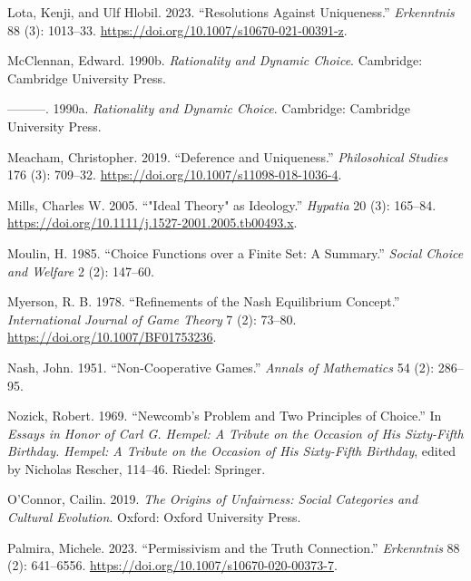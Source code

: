 \documentclass[
  12pt,
  letterpaper,
  DIV=11,
  numbers=noendperiod]{scrreprt}
\newlength{\cslhangindent}
\newlength{\cslentryspacingunit} %
\newenvironment{CSLReferences}[2] %
 {%
  \setlength{\parindent}{0pt}
  \ifodd #1
  \let\oldpar\par
  \def\par{\hangindent=\cslhangindent\oldpar}
  \fi
  \setlength{\parskip}{#2\cslentryspacingunit}
 }%
 {}
\begin{document}
\begin{CSLReferences}{1}{0}
\leavevmode{}%
Lota, Kenji, and Ulf Hlobil. 2023. {``Resolutions Against Uniqueness.''}
\emph{Erkenntnis} 88 (3): 1013--33.
\url{https://doi.org/10.1007/s10670-021-00391-z}.

\leavevmode{}%
McClennan, Edward. 1990b. \emph{Rationality and Dynamic Choice}.
Cambridge: {C}ambridge {U}niversity {P}ress.

\leavevmode{}%
---------. 1990a. \emph{Rationality and Dynamic Choice}. Cambridge:
Cambridge University Press.

\leavevmode{}%
Meacham, Christopher. 2019. {``Deference and Uniqueness.''}
\emph{Philosohical Studies} 176 (3): 709--32.
\url{https://doi.org/10.1007/s11098-018-1036-4}.

\leavevmode{}%
Mills, Charles W. 2005. {``"Ideal Theory" as Ideology.''} \emph{Hypatia}
20 (3): 165--84.
\url{https://doi.org/10.1111/j.1527-2001.2005.tb00493.x}.

\leavevmode{}%
Moulin, H. 1985. {``Choice Functions over a Finite Set: A Summary.''}
\emph{Social Choice and Welfare} 2 (2): 147--60.

\leavevmode{}%
Myerson, R. B. 1978. {``Refinements of the Nash Equilibrium Concept.''}
\emph{International Journal of Game Theory} 7 (2): 73--80.
\url{https://doi.org/10.1007/BF01753236}.

\leavevmode{}%
Nash, John. 1951. {``Non-Cooperative Games.''} \emph{Annals of
Mathematics} 54 (2): 286--95.

\leavevmode{}%
Nozick, Robert. 1969. {``Newcomb's Problem and Two Principles of
Choice.''} In \emph{Essays in Honor of Carl {G}. Hempel: A Tribute on
the Occasion of His Sixty-Fifth Birthday. Hempel: A Tribute on the
Occasion of His Sixty-Fifth Birthday}, edited by Nicholas Rescher,
114--46. Riedel: Springer.

\leavevmode{}%
O'Connor, Cailin. 2019. \emph{The Origins of Unfairness: Social
Categories and Cultural Evolution}. Oxford: {O}xford {U}niversity
{P}ress.

\leavevmode{}%
Palmira, Michele. 2023. {``Permissivism and the Truth Connection.''}
\emph{Erkenntnis} 88 (2): 641--6556.
\url{https://doi.org/10.1007/s10670-020-00373-7}.


\end{CSLReferences}
\end{document}
